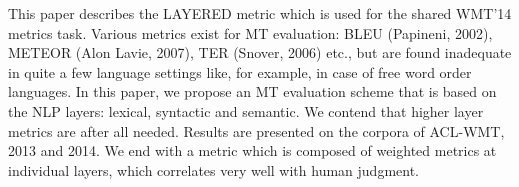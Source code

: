 This paper describes the LAYERED metric which is used for the shared WMT'14 metrics task. Various metrics exist for MT evaluation: BLEU (Papineni, 2002), METEOR (Alon Lavie, 2007), TER (Snover, 2006) etc., but are found inadequate in quite a few language settings like, for example, in case of free word order languages. In this paper, we propose an MT evaluation scheme that is based on the NLP layers: lexical, syntactic and semantic. We contend that higher layer metrics are after all needed. Results are presented on the corpora of ACL-WMT, 2013 and 2014. We end with a metric which is composed of weighted metrics at individual layers, which correlates very well with human judgment.

